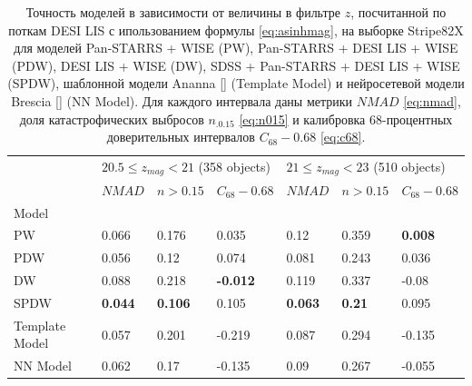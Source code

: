 \documentclass[fleqn,usenatbib]{mnras}
\begin{document}
\begin{table}
	\begin{tabular}{lllllll}
            \hline
            {} & \multicolumn{3}{l}{$20.5 \leq z_{mag} < 21$ (358 objects)} & \multicolumn{3}{l}{$21 \leq z_{mag} < 23$ (510 objects)} \\
            {} &                                 $NMAD$ &        $n>0.15$ &  $C_{68} - 0.68$ &                               $NMAD$ &       $n>0.15$ & $C_{68} - 0.68$ \\
            Model          &                                        &                 &                  &                                      &                &                 \\
            \hline
            PW             &                                  0.066 &           0.176 &            0.035 &                                 0.12 &          0.359 &  \textbf{0.008} \\
            PDW            &                                  0.056 &            0.12 &            0.074 &                                0.081 &          0.243 &           0.036 \\
            DW             &                                  0.088 &           0.218 &  \textbf{-0.012} &                                0.119 &          0.337 &           -0.08 \\
            SPDW           &                         \textbf{0.044} &  \textbf{0.106} &            0.105 &                       \textbf{0.063} &  \textbf{0.21} &           0.095 \\
            Template Model &                                  0.057 &           0.201 &           -0.219 &                                0.087 &          0.294 &          -0.135 \\
            NN Model       &                                  0.062 &            0.17 &           -0.135 &                                 0.09 &          0.267 &          -0.055 \\
            \hline
            \end{tabular}
            \caption{Точность моделей в зависимости от величины в фильтре $z$, посчитанной по поткам DESI LIS с ипользованием формулы \eqref{eq:asinhmag}, на выборке Stripe82X для моделей Pan-STARRS + WISE (PW), Pan-STARRS + DESI LIS + WISE (PDW), DESI LIS + WISE (DW), SDSS + Pan-STARRS + DESI LIS + WISE (SPDW), шаблонной модели Ananna \ref{} (Template Model) и нейросетевой модели Brescia \ref{} (NN Model). Для каждого интервала даны метрики $NMAD$ \eqref{eq:nmad}, доля катастрофических выбросов $n_{.0.15}$ \eqref{eq:n015} и калибровка 68-процентных доверительных интервалов $C_{68} - 0.68$ \eqref{eq:c68}.}
\end{table}
\end{document}
